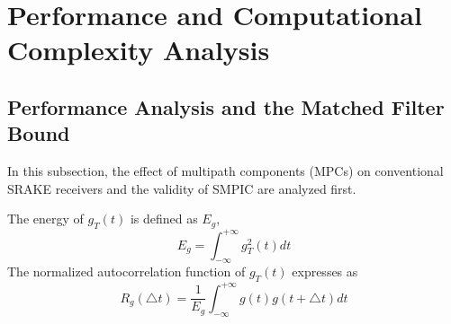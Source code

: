 \documentclass[journal]{IEEEtran}
\begin{document}
\section{Performance and Computational Complexity Analysis}

\subsection{Performance Analysis and the Matched Filter Bound}
In this subsection, the effect of multipath components (MPCs) on
conventional SRAKE receivers and the validity of SMPIC are analyzed
first.

The energy of $g_T(t)$ is defined as $E_g $,
\begin{equation}
\label{energy} E_g = \int_{-\infty}^{+\infty}g_T^2(t)dt
\end{equation}
The normalized autocorrelation function of $g_T(t)$ expresses as
\begin{equation}
\label{autocorr} R_g(\triangle t) =\frac{1}{E_g}
\int_{-\infty}^{+\infty}g(t)g(t+\triangle t)dt
\end{equation}
\end{document}
